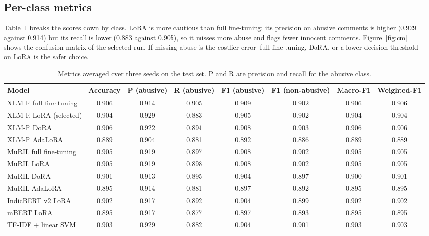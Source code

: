 \documentclass[conference]{IEEEtran}
\begin{document}
\subsection{Per-class metrics}
Table~\ref{tab:perclass} breaks the scores down by class. LoRA is more cautious than full fine-tuning: its precision on abusive comments is higher (0.929 against 0.914) but its recall is lower (0.883 against 0.905), so it misses more abuse and flags fewer innocent comments. Figure~\ref{fig:cm} shows the confusion matrix of the selected run. If missing abuse is the costlier error, full fine-tuning, DoRA, or a lower decision threshold on LoRA is the safer choice.

\begin{table}[t]
\caption{Metrics averaged over three seeds on the test set. P and R are precision and recall for the abusive class.}
\label{tab:perclass}
\centering
\footnotesize
\setlength{\tabcolsep}{6pt}
\begin{tabular}{lccccccc}
\toprule
Model & Accuracy & P (abusive) & R (abusive) & F1 (abusive) & F1 (non-abusive) & Macro-F1 & Weighted-F1 \\
\midrule
XLM-R full fine-tuning & 0.906 & 0.914 & 0.905 & 0.909 & 0.902 & 0.906 & 0.906 \\
XLM-R LoRA (selected) & 0.904 & 0.929 & 0.883 & 0.905 & 0.902 & 0.904 & 0.904 \\
XLM-R DoRA & 0.906 & 0.922 & 0.894 & 0.908 & 0.903 & 0.906 & 0.906 \\
XLM-R AdaLoRA & 0.889 & 0.904 & 0.881 & 0.892 & 0.886 & 0.889 & 0.889 \\
MuRIL full fine-tuning & 0.905 & 0.919 & 0.897 & 0.908 & 0.902 & 0.905 & 0.905 \\
MuRIL LoRA & 0.905 & 0.919 & 0.898 & 0.908 & 0.902 & 0.905 & 0.905 \\
MuRIL DoRA & 0.901 & 0.913 & 0.895 & 0.904 & 0.897 & 0.900 & 0.901 \\
MuRIL AdaLoRA & 0.895 & 0.914 & 0.881 & 0.897 & 0.892 & 0.895 & 0.895 \\
IndicBERT v2 LoRA & 0.902 & 0.917 & 0.892 & 0.904 & 0.899 & 0.902 & 0.902 \\
mBERT LoRA & 0.895 & 0.917 & 0.877 & 0.897 & 0.893 & 0.895 & 0.895 \\
TF-IDF + linear SVM & 0.903 & 0.929 & 0.882 & 0.904 & 0.901 & 0.903 & 0.903 \\
\bottomrule
\end{tabular}
\end{table}
\end{document}

